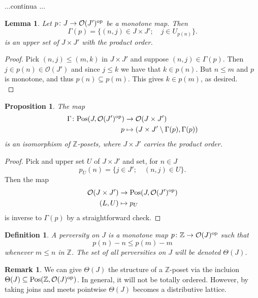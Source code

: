 \documentclass{article}
\newtheorem{prop}[thm]{Proposition}
\newtheorem{lem}[thm]{Lemma}
\newtheorem{defn}[thm]{Definition}
\theoremstyle{definition}
\newtheorem{rem}[thm]{Remark}
\newcommand{\Z}{\mathbb{Z}}
\newcommand{\Oo}{\mathcal{O}}
\newcommand{\per}{\Theta}
\newcommand{\pos}{\textnormal{Pos}}
\newcommand{\op}{\textnormal{op}}
\newcommand{\gr}{\Gamma}
\begin{document}
  ...continua ...
  
\begin{lem}
  Let $p \colon J \to \Oo(J')^\op$ be a monotone map. Then $$\gr(p)=\{ (n,j) \in J \times J'; \quad j \in U_{p(n)} \}.$$
  is an upper set of $J \times J'$ with the product order.
\end{lem}

\begin{proof}
Pick $(n,j) \leq (m,k)$ in $J \times J'$ and suppose $(n,j) \in \gr(p)$. Then $j \in p(n) \in \Oo(J')$ and since $j \leq k$ we have that $k \in p(n)$. But  $n \leq m$ and $p$ is monotone, and thus $p(n) \subseteq p(m)$. This gives $k \in p(m)$, as desired. \\
\end{proof}


\begin{prop}
  The map 
  \begin{align*}
 \gr \colon \pos(J,\Oo(J')^\op)&\to \Oo(J \times J')\\
   p & \mapsto (J \times J' \setminus \gr(p), \gr(p))  
  \end{align*}
is an isomorphism of $\Z$-posets, where $J \times J'$ carries the product order. 
\end{prop}

\begin{proof}
  Pick and upper set $U$ of $J \times J'$ and set, for $n \in J$ $$p_U(n)=\{ j \in J'; \quad  (n,j) \in U \}.$$
 Then the map
   \begin{align*}
   \Oo(J \times J') &\to \pos(J,\Oo(J')^\op) \\
  (L,U) & \mapsto p_U
  \end{align*}
  is inverse to $\gr(p)$ by a straightforward check. 
\end{proof}

\begin{defn}
A \emph{perversity} on $J$ is a monotone map $p \colon \Z \to \Oo(J)^\op$ such that $$p(n)-n \leq p(m) -m$$
whenever $m \leq n$ in $\Z$. The set of all perversities on $J$ will be denoted $\per(J)$. 
\end{defn}

\begin{rem}
We can give $\per(J)$ the structure of a $\Z$-poset via the incluion $\per(J) \subseteq \pos(\Z,\Oo(J)^\op)$. In general, it will not be totally ordered. However, by taking joins and meets pointwise $\per(J)$ becomes a distributive lattice. 
\end{rem}
\end{document}
